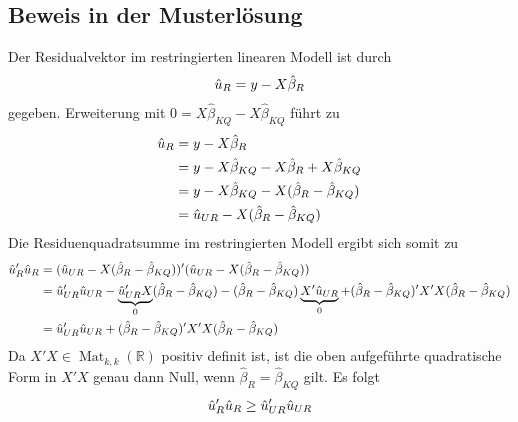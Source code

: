 \documentclass{article}
\DeclareMathOperator{\Mat}{Mat}
\begin{document}
	\subsection{Beweis in der Musterlösung}
	Der Residualvektor im restringierten linearen Modell ist durch
	\begin{align}
		\hat{u}_R = y-X\hat{\beta}_R \notag
	\end{align}
	gegeben. Erweiterung mit $0=X\hat{\beta}_{KQ}-X\hat{\beta}_{KQ}$ führt zu
	\begin{align}
		\hat{u}_R &= y-X\hat{\beta}_R \notag \\
		&= y-X\hat{\beta}_{KQ} - X\hat{\beta}_R + X\hat{\beta}_{KQ} \notag \\
		&= y-X\hat{\beta}_{KQ} - X(\hat{\beta}_R-\hat{\beta}_{KQ}) \notag \\
		&= \hat{u}_{UR} - X(\hat{\beta}_R - \hat{\beta}_{KQ}) \notag
	\end{align}
	Die Residuenquadratsumme im restringierten Modell ergibt sich somit zu
	\begin{align}
		\hat{u}_R'\hat{u}_R &= (\hat{u}_{UR} - X(\hat{\beta}_R - \hat{\beta}_{KQ}))'(\hat{u}_{UR} - X(\hat{\beta}_R - \hat{\beta}_{KQ})) \notag \\
		&= \hat{u}_{UR}'\hat{u}_{UR} - \underbrace{\hat{u}_{UR}'X}_0(\hat{\beta}_R-\hat{\beta}_{KQ}) - (\hat{\beta}_R-\hat{\beta}_{KQ})\underbrace{X'\hat{u}_{UR}}_0  + (\hat{\beta}_R-\hat{\beta}_{KQ})'X'X(\hat{\beta}_R-\hat{\beta}_{KQ}) \notag \\
		&= \hat{u}_{UR}'\hat{u}_{UR} + (\hat{\beta}_R-\hat{\beta}_{KQ})'X'X(\hat{\beta}_R-\hat{\beta}_{KQ}) \notag
	\end{align}
	Da $X'X\in\Mat_{k,k}(\mathbb{R})$ positiv definit ist, ist die oben aufgeführte quadratische Form in $X'X$ genau dann Null, wenn $\hat{\beta}_R=\hat{\beta}_{KQ}$ gilt. Es folgt
	\begin{align}
		\hat{u}_R'\hat{u}_R \ge \hat{u}_{UR}'\hat{u}_{UR} \notag
	\end{align}
	
\end{document}

